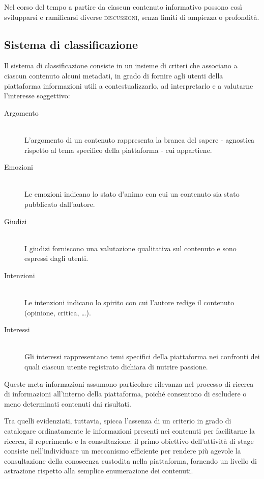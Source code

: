 Nel corso del tempo a partire da ciascun contenuto informativo possono così svilupparsi e ramificarsi diverse \textsc{discussioni}, senza limiti di ampiezza o profondità.

\subsection{Sistema di classificazione}
\label{sec:tesi:progetto:classificazione}
Il sistema di classificazione consiste in un insieme di criteri che associano a ciascun contenuto alcuni metadati, in grado di fornire agli utenti della piattaforma informazioni utili a contestualizzarlo, ad interpretarlo e a valutarne l'interesse soggettivo:
\begin{description}
 	\item[Argomento] \hfill \\
 	L'argomento di un contenuto rappresenta la branca del sapere - agnostica rispetto al tema specifico della piattaforma - cui appartiene. 
 	\item[Emozioni] \hfill \\
 	Le emozioni indicano lo stato d'animo con cui un contenuto sia stato pubblicato dall'autore.
 	\item[Giudizi] \hfill \\
 	I giudizi forniscono una valutazione qualitativa sul contenuto e sono espressi dagli utenti.
 	\item[Intenzioni] \hfill \\
 	Le intenzioni indicano lo spirito con cui l'autore redige il contenuto (opinione, critica, \ldots).
 	\item[Interessi] \hfill \\
 	Gli interessi rappresentano temi specifici della piattaforma nei confronti dei quali ciascun utente registrato dichiara di nutrire passione.
\end{description}

Queste meta-informazioni assumono particolare rilevanza nel processo di ricerca di informazioni all'interno della piattaforma, poiché consentono di escludere o meno determinati contenuti dai risultati.

Tra quelli evidenziati, tuttavia, spicca l'assenza di un criterio in grado di catalogare ordinatamente le informazioni presenti nei contenuti per facilitarne la ricerca, il reperimento e la consultazione: il primo obiettivo dell'attività di stage consiste nell'individuare un meccanismo efficiente per rendere più agevole la consultazione della conoscenza custodita nella piattaforma, fornendo un livello di astrazione rispetto alla semplice enumerazione dei contenuti.

